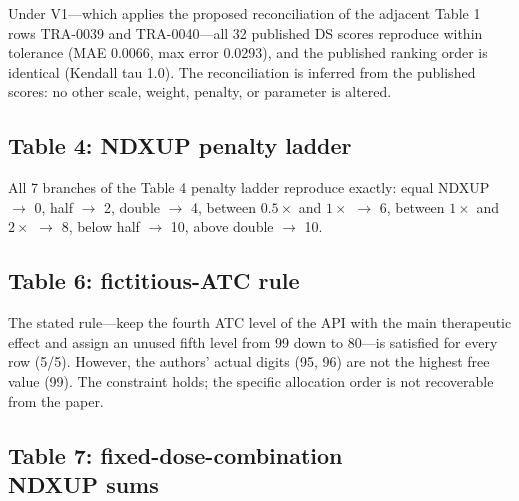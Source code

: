 \documentclass[a4paper]{elsarticle}
\begin{document}
Under V1---which applies the proposed reconciliation of the adjacent Table 1 rows TRA-0039 and TRA-0040---all 32 published DS scores reproduce within tolerance (MAE 0.0066, max error 0.0293), and the published ranking order is identical (Kendall tau 1.0). The reconciliation is inferred from the published scores: no other scale, weight, penalty, or parameter is altered.

\subsection{Table 4: NDXUP penalty ladder}
\label{sec:results-table4}

All 7 branches of the Table 4 penalty ladder reproduce exactly: equal NDXUP $\to$ 0, half $\to$ 2, double $\to$ 4, between $0.5\times$ and $1\times$ $\to$ 6, between $1\times$ and $2\times$ $\to$ 8, below half $\to$ 10, above double $\to$ 10.

\subsection{Table 6: fictitious-ATC rule}
\label{sec:results-table6}

The stated rule---keep the fourth ATC level of the API with the main therapeutic effect and assign an unused fifth level from 99 down to 80---is satisfied for every row (5/5). However, the authors' actual digits (95, 96) are not the highest free value (99). The constraint holds; the specific allocation order is not recoverable from the paper.

\subsection{Table 7: fixed-dose-combination\\ NDXUP sums}
\label{sec:results-table7}

\begin{table}[htbp]
\centering\small
\caption{Reproduction of the 5 published Table 7 NDXUP sums under two unit conventions. A row counts as reproduced when \emph{some} convention matches.}
\label{tab:table7}
\end{table}
\end{document}
